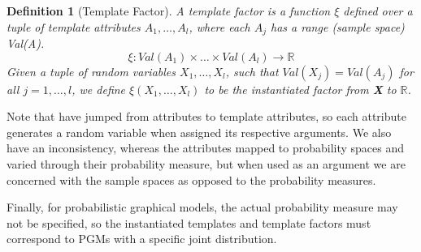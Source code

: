 \documentclass[11pt]{article}
\newtheorem{definition}{Definition}
\begin{document}
\begin{definition}[Template Factor]
  A \emph{template factor} is a function $\xi$ defined over a tuple of template attributes $A_1,\ldots,A_l$, where each $A_j$ has a range (sample space) Val(A).
  \begin{equation}
    \xi \colon Val(A_1) \times \ldots \times Val(A_l) \rightarrow \mathbb{R}
    \label{eqn:template factor}
  \end{equation}
  Given a tuple of random variables $X_1,\ldots,X_l$, such that $Val(X_j) = Val(A_j)$ for all $j = 1, \ldots, l$, we define $\xi\left( X_1,\ldots,X_l \right)$ to be the \emph{instantiated factor} from \textbf{X} to $\mathbb{R}$.
\end{definition}

Note that have jumped from attributes to template attributes, so each attribute generates a random variable when assigned its respective arguments. 
We also have an inconsistency, whereas the attributes mapped to probability spaces and varied through their probability measure, but when used as an argument we are concerned with the sample spaces as opposed to the probability measures.  


Finally, for probabilistic graphical models, the actual probability measure may not be specified, so the instantiated templates and template factors must correspond to PGMs with a specific joint distribution.
\end{document}
